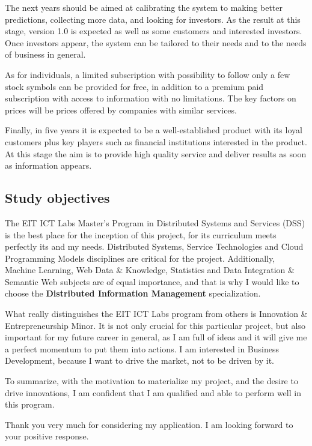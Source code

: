 \documentclass[a4paper,12pt]{article}
\begin{document}
The next years should be aimed at calibrating the system to making better predictions, collecting more data, and looking for investors. As the result at this stage, version 1.0 is expected as well as some customers and interested investors. Once investors appear, the system can be tailored to their needs and to the needs of business in general.

As for individuals, a limited subscription with possibility to follow only a few stock symbols can be provided for free, in addition to a premium paid subscription with access to information with no limitations. The key factors on prices will be prices offered by companies with similar services. 

Finally, in five years it is expected to be a well-established product with its loyal customers plus key players such as financial institutions interested in the product. At this stage the aim is to provide high quality service and deliver results as soon as information appears.

\subsection*{Study objectives}

The EIT ICT Labs Master's Program in Distributed Systems and Services (DSS) is the best place for the inception of this project, for its curriculum meets perfectly its and my needs. Distributed Systems, Service Technologies and Cloud Programming Models disciplines are critical for the project. Additionally, Machine Learning, Web Data \& Knowledge, Statistics and Data Integration \& Semantic Web subjects are of equal importance, and that is why I would like to choose the \textbf{Distributed Information Management} specialization. 

What really distinguishes the EIT ICT Labs program from others is Innovation \& Entrepreneurship Minor. It is not only crucial for this particular project, but also important for my future career in general, as I am full of ideas and it will give me a perfect momentum to put them into actions. I am interested in Business Development, because I want to drive the market, not to be driven by it. 

To summarize, with the motivation to materialize my project, and the desire to drive innovations, I am confident that I am qualified and able to perform well in this program.

Thank you very much for considering my application. I am looking forward to your positive response.
\end{document}
